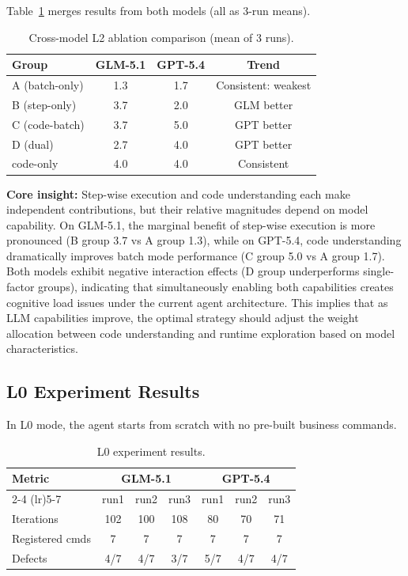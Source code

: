 \documentclass[sigconf,nonacm]{acmart}
\begin{document}
Table~\ref{tab:cross-model} merges results from both models (all as 3-run means).

\begin{table}[t]
\caption{Cross-model L2 ablation comparison (mean of 3 runs).}
\label{tab:cross-model}
\small
\begin{tabular}{lccc}
\toprule
Group & GLM-5.1 & GPT-5.4 & Trend \\
\midrule
A (batch-only) & 1.3 & 1.7 & Consistent: weakest \\
B (step-only) & 3.7 & 2.0 & GLM better \\
C (code-batch) & 3.7 & 5.0 & GPT better \\
D (dual) & 2.7 & 4.0 & GPT better \\
code-only & 4.0 & 4.0 & Consistent \\
\bottomrule
\end{tabular}
\end{table}

\textbf{Core insight:} Step-wise execution and code understanding each make independent contributions, but their relative magnitudes depend on model capability. On GLM-5.1, the marginal benefit of step-wise execution is more pronounced (B group 3.7 vs A group 1.3), while on GPT-5.4, code understanding dramatically improves batch mode performance (C group 5.0 vs A group 1.7). Both models exhibit negative interaction effects (D group underperforms single-factor groups), indicating that simultaneously enabling both capabilities creates cognitive load issues under the current agent architecture. This implies that as LLM capabilities improve, the optimal strategy should adjust the weight allocation between code understanding and runtime exploration based on model characteristics.

\subsection{L0 Experiment Results}

In L0 mode, the agent starts from scratch with no pre-built business commands.

\begin{table}[t]
\caption{L0 experiment results.}
\label{tab:l0}
\small
\begin{tabular}{lcccccc}
\toprule
Metric & \multicolumn{3}{c}{GLM-5.1} & \multicolumn{3}{c}{GPT-5.4} \\
\cmidrule(lr){2-4} \cmidrule(lr){5-7}
 & run1 & run2 & run3 & run1 & run2 & run3 \\
\midrule
Iterations & 102 & 100 & 108 & 80 & 70 & 71 \\
Registered cmds & 7 & 7 & 7 & 7 & 7 & 7 \\
Defects & 4/7 & 4/7 & 3/7 & 5/7 & 4/7 & 4/7 \\
\bottomrule
\end{tabular}
\end{table}
\end{document}
